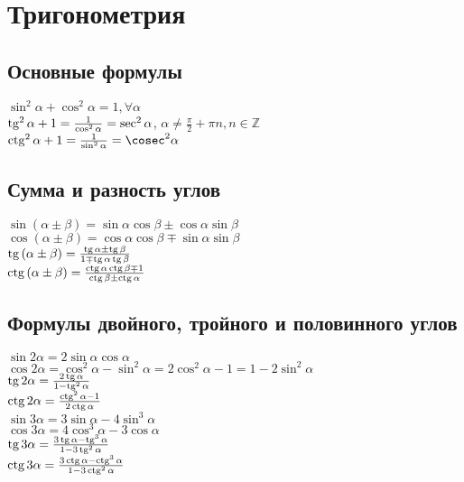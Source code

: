 

\section{Тригонометрия}


\subsection{Основные формулы}

$\sin^2 \alpha + \cos^2 \alpha = 1 ,  \forall \alpha $ \\
$\operatorname{tg}^2 \alpha + 1 = \frac{1}{\cos^2 \alpha} = \sec^2 \alpha $, $\alpha \neq \frac{\pi}{2} + \pi n, n \in \mathbb Z $ \\
$\ctg^2 \alpha + 1 = \frac{1}{\sin^2 \alpha} = \cosec^2 \alpha$ \\


\subsection{Сумма и разность углов}


$\sin \left( \alpha \pm \beta \right) = \sin \alpha \cos \beta \pm \cos \alpha \sin \beta$ \\
$\cos \left( \alpha \pm \beta \right) = \cos \alpha \cos \beta \mp \sin \alpha \sin \beta$ \\
$\operatorname{tg} \left( \alpha \pm \beta \right) = \frac{ \operatorname{tg} \alpha \pm \operatorname{tg} \beta}{1 \mp \operatorname{tg} \alpha \operatorname{tg}\beta}$ \\
$\operatorname{ctg} \left( \alpha \pm \beta \right) = \frac{ \operatorname{ctg} \alpha \operatorname{ctg} \beta \mp 1}{\operatorname{ctg} \beta \pm \operatorname{ctg}\alpha}$ \\

\subsection{Формулы двойного, тройного и половинного углов}

$ \sin 2 \alpha = 2 {\sin \alpha}{\cos \alpha} $ \\
$ \cos 2 \alpha = {\cos^2 \alpha} - {\sin^2 \alpha} = 2 {\cos^2 \alpha} - 1 = 1 - 2 {\sin^2 \alpha} $ \\
$ \operatorname{tg} 2 \alpha = \frac{2 \operatorname{tg} \alpha}{1 - \operatorname{tg}^2 \alpha} $ \\
$ \operatorname{ctg} 2 \alpha = \frac{\operatorname{ctg}^2 \alpha - 1}{2 \operatorname{ctg} \alpha} $ \\

$\sin 3\alpha = 3 \sin \alpha - 4 \sin^3\alpha \,$ \\
$\cos 3\alpha = 4 \cos^3\alpha - 3 \cos \alpha \,$ \\
$\operatorname{tg} 3\alpha = \frac{3 \operatorname{tg}\alpha - \operatorname{tg}^3\alpha}{1 - 3 \operatorname{tg}^2\alpha}$ \\
$\operatorname{ctg} 3\alpha = \frac{3 \operatorname{ctg}\alpha - \operatorname{ctg}^3\alpha}{1 - 3 \operatorname{ctg}^2\alpha}$ \\

